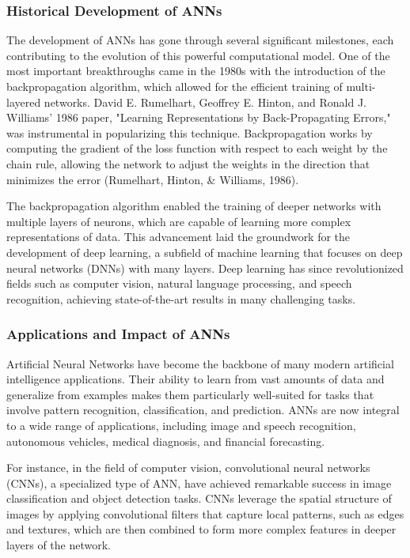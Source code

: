 \documentclass[12pt,twoside]{article}
\begin{document}
\subsubsection{Historical Development of ANNs}

The development of ANNs has gone through several significant milestones, each contributing to the evolution of this powerful computational model. One of the most important breakthroughs came in the 1980s with the introduction of the backpropagation algorithm, which allowed for the efficient training of multi-layered networks. David E. Rumelhart, Geoffrey E. Hinton, and Ronald J. Williams' 1986 paper, "Learning Representations by Back-Propagating Errors," was instrumental in popularizing this technique. Backpropagation works by computing the gradient of the loss function with respect to each weight by the chain rule, allowing the network to adjust the weights in the direction that minimizes the error (Rumelhart, Hinton, & Williams, 1986).

The backpropagation algorithm enabled the training of deeper networks with multiple layers of neurons, which are capable of learning more complex representations of data. This advancement laid the groundwork for the development of deep learning, a subfield of machine learning that focuses on deep neural networks (DNNs) with many layers. Deep learning has since revolutionized fields such as computer vision, natural language processing, and speech recognition, achieving state-of-the-art results in many challenging tasks.

\subsubsection{Applications and Impact of ANNs}

Artificial Neural Networks have become the backbone of many modern artificial intelligence applications. Their ability to learn from vast amounts of data and generalize from examples makes them particularly well-suited for tasks that involve pattern recognition, classification, and prediction. ANNs are now integral to a wide range of applications, including image and speech recognition, autonomous vehicles, medical diagnosis, and financial forecasting.

For instance, in the field of computer vision, convolutional neural networks (CNNs), a specialized type of ANN, have achieved remarkable success in image classification and object detection tasks. CNNs leverage the spatial structure of images by applying convolutional filters that capture local patterns, such as edges and textures, which are then combined to form more complex features in deeper layers of the network.
\end{document}
